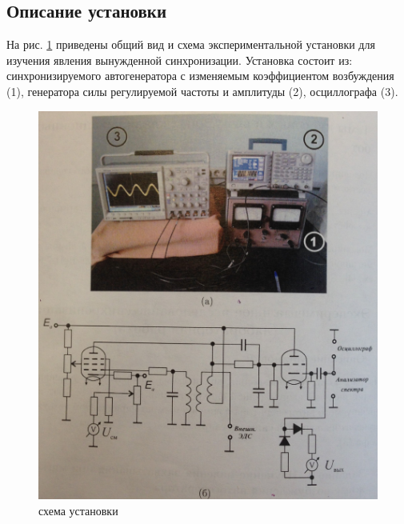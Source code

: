 \documentclass[a4paper,14pt]{extarticle}
\begin{document}
\subsection*{Описание установки}
На рис. \ref{pic.1} приведены общий вид и схема экспериментальной установки для изучения явления вынужденной синхронизации. Установка состоит из: синхронизируемого автогенератора с изменяемым коэффициентом возбуждения (1), генератора силы регулируемой частоты и амплитуды (2), осциллографа (3).
\begin{figure}[H]
	\centering
	\includegraphics[width=0.8\linewidth]{photo/IMG_9783}
	\caption{схема установки}
	\label{pic.1}
\end{figure}
\end{document}

